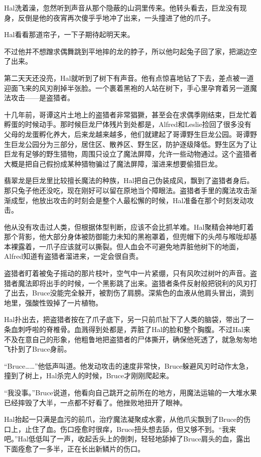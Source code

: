 \documentclass[../main.tex]{subfiles}
\begin{document}
Hal洗着澡，忽然听到声音从那个隐蔽的山洞里传来。他转头看去，巨龙没有现身，反倒是他的夜宵再次傻乎乎地冲了出来，一头撞进了他的爪子。

Hal看看那道帘子，一下子期待起明天来。

不过他并不想蹭求偶舞跳到平地摔的龙的脖子，所以他叼起兔子回了家，把湖边空了出来。

第二天天还没亮，Hal就听到了树下有声音。他有点惊喜地钻了下去，差点被一道迎面飞来的风刃削掉半张脸。一个裹着黑袍的人站在树下，手心里孕育着另一道魔法攻击------是盗猎者。

十几年前，哥谭这片土地上的盗猎者非常猖獗，甚至会在求偶季刚结束，巨龙忙着孵蛋的时候动手。那时候巨龙尸体残片到处都是，Alfred和Leslie捡回了很多没有父母的龙蛋孵化养大，后来龙越来越多，他们就建起了哥谭野生巨龙公园。哥谭野生巨龙公园分为三部分，居住区、散养区、野生区，防护逐级降低。野生区为了让巨龙有足够的野生猎物，周围只设立了魔法屏障，允许一些动物通过。这个盗猎者大概是把自己假扮成某种猎物骗过了魔法屏障，溜进来想要偷猎巨龙。

翡翠龙是巨龙里比较擅长魔法的种族，Hal把自己伪装成风，飘到了盗猎者身后。那只兔子他还没吃，现在刚好可以留在原地当个障眼法。盗猎者手里的魔法攻击渐渐成型，他放出攻击的时刻会是整个人最松懈的时候，Hal准备在那个时刻发动攻击。

他从没有攻击过人类，但根据体型判断，应该不会比抓羊难。Hal聚精会神地盯着那个背影，他大部分身体被防御能力未知的黑袍罩着，但兜帽下的头颅与喉咙却基本裸露着，一爪子应该就可以撕裂。但人血会不可避免地弄脏他树下的地面，Alfred知道有盗猎者溜进来，一定会很自责。

盗猎者盯着被兔子摇动的那片枝叶，空气中一片紧绷，只有风吹过树叶的声音。盗猎者魔法即将出手的时候，一个黑影跳了出来。盗猎者条件反射般把锐利的风刃打了出去，Bruce没能完全躲开，被割伤了肩膀。深紫色的血液从他肩头冒出，滴到地里，强酸性毁掉了一片植物。

Hal扑出去，把盗猎者按在了爪子底下，另一只前爪扯下了人类的脑袋，带出了一条血刺呼啦的脊椎骨。血溅得到处都是，弄脏了Hal的脸和整个胸腹。不过Hal来不及在意自己的形象，他粗鲁地把盗猎者的尸体撕开，确保他死透了，就急匆匆地飞扑到了Bruce身前。

``Bruce\ldots\ldots''他低声叫道。他发动攻击的速度非常快，Bruce躲避风刃时动作太急，撞到了树上，Hal杀完人的时候，Bruce才刚刚爬起来。

``我没事。''Bruce说道，他看向自己跳开之前所在的地方，用魔法运输的一大堆水果已经摔毁了大半，一点都不好看了。他挫败地扭开了眼神。

Hal抬起一只满是血污的前爪，治疗魔法凝聚成水雾，从他爪尖飘到了Bruce的伤口上，止住了血。伤口痊愈时很痒，Bruce扭头想去舔，但又够不到。``我来吧。''Hal低低叫了一声，收起舌头上的倒刺，轻轻地舔掉了Bruce肩头的血，露出下面痊愈了一多半，正在长出新鳞片的伤口。
\end{document}
